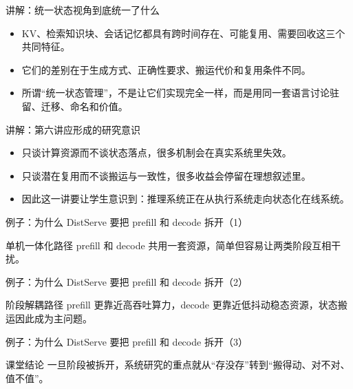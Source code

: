 \begin{frame}{讲解：统一状态视角到底统一了什么}
  \begin{itemize}
    \item KV、检索知识块、会话记忆都具有跨时间存在、可能复用、需要回收这三个共同特征。
    \item 它们的差别在于生成方式、正确性要求、搬运代价和复用条件不同。
    \item 所谓“统一状态管理”，不是让它们实现完全一样，而是用同一套语言讨论驻留、迁移、命名和价值。
  \end{itemize}
\end{frame}

\begin{frame}{讲解：第六讲应形成的研究意识}
  \begin{itemize}
    \item 只谈计算资源而不谈状态落点，很多机制会在真实系统里失效。
    \item 只谈潜在复用而不谈搬运与一致性，很多收益会停留在理想叙述里。
    \item 因此这一讲要让学生意识到：推理系统正在从执行系统走向状态化在线系统。
  \end{itemize}
\end{frame}

\begin{frame}{例子：为什么 DistServe 要把 prefill 和 decode 拆开（1）}
\begin{block}{单机一体化路径}
    prefill 和 decode 共用一套资源，简单但容易让两类阶段互相干扰。
  \end{block}
\end{frame}

\begin{frame}{例子：为什么 DistServe 要把 prefill 和 decode 拆开（2）}
\begin{block}{阶段解耦路径}
    prefill 更靠近高吞吐算力，decode 更靠近低抖动稳态资源，状态搬运因此成为主问题。
  \end{block}
\end{frame}

\begin{frame}{例子：为什么 DistServe 要把 prefill 和 decode 拆开（3）}
\begin{block}{课堂结论}
    一旦阶段被拆开，系统研究的重点就从“存没存”转到“搬得动、对不对、值不值”。
  \end{block}
\end{frame}

